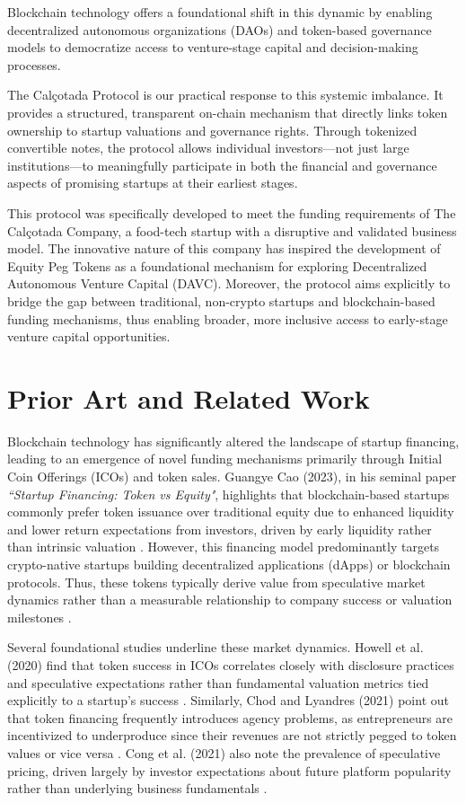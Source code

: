 \documentclass[conference]{IEEEtran}
\begin{document}
Blockchain technology offers a foundational shift in this dynamic by enabling decentralized autonomous organizations (DAOs) and token-based governance models to democratize access to venture-stage capital and decision-making processes.

The Calçotada Protocol is our practical response to this systemic imbalance. It provides a structured, transparent on-chain mechanism that directly links token ownership to startup valuations and governance rights. Through tokenized convertible notes, the protocol allows individual investors—not just large institutions—to meaningfully participate in both the financial and governance aspects of promising startups at their earliest stages.

This protocol was specifically developed to meet the funding requirements of The Calçotada Company, a food-tech startup with a disruptive and validated business model. The innovative nature of this company has inspired the development of Equity Peg Tokens as a foundational mechanism for exploring Decentralized Autonomous Venture Capital (DAVC). Moreover, the protocol aims explicitly to bridge the gap between traditional, non-crypto startups and blockchain-based funding mechanisms, thus enabling broader, more inclusive access to early-stage venture capital opportunities.

\section{Prior Art and Related Work}

Blockchain technology has significantly altered the landscape of startup financing, leading to an emergence of novel funding mechanisms primarily through Initial Coin Offerings (ICOs) and token sales. Guangye Cao (2023), in his seminal paper \textit{``Startup Financing: Token vs Equity"}, highlights that blockchain-based startups commonly prefer token issuance over traditional equity due to enhanced liquidity and lower return expectations from investors, driven by early liquidity rather than intrinsic valuation \cite{cao2023token}. However, this financing model predominantly targets crypto-native startups building decentralized applications (dApps) or blockchain protocols. Thus, these tokens typically derive value from speculative market dynamics rather than a measurable relationship to company success or valuation milestones \cite{howell2020initial, catalini2019some}.

Several foundational studies underline these market dynamics. Howell et al. (2020) find that token success in ICOs correlates closely with disclosure practices and speculative expectations rather than fundamental valuation metrics tied explicitly to a startup’s success \cite{howell2020initial}. Similarly, Chod and Lyandres (2021) point out that token financing frequently introduces agency problems, as entrepreneurs are incentivized to underproduce since their revenues are not strictly pegged to token values or vice versa \cite{chod2021theory}. Cong et al. (2021) also note the prevalence of speculative pricing, driven largely by investor expectations about future platform popularity rather than underlying business fundamentals \cite{cong2021tokenomics}.
\end{document}
